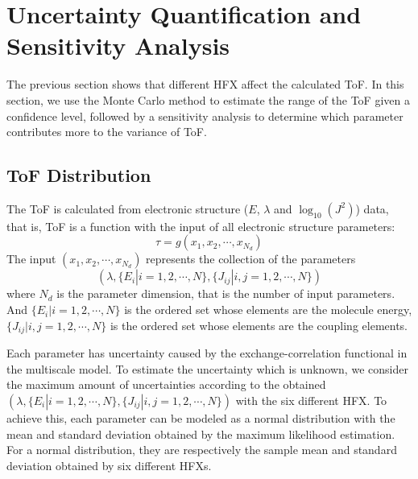 \documentclass[%
 reprint,
superscriptaddress,
 amsmath,amssymb,
 aps,
prb,
floatfix
]{revtex4-2}
\begin{document}
\section{Uncertainty Quantification and Sensitivity Analysis}
\label{sec:UQ}
The previous section shows that different HFX affect the calculated ToF. In this section, we use the Monte Carlo method to estimate the range of the ToF given a confidence level, followed by a sensitivity analysis to determine which parameter contributes more to the variance of ToF. 

\subsection{ToF Distribution}
The ToF is calculated from electronic structure ($E$, $\lambda$ and $\log_{10}(J^2)$) data, that is, ToF is a function with the input of all electronic structure parameters:
\begin{equation}
    \tau = g(x_1, x_2, \cdots, x_{N_d})
    \label{eq:tau1}
\end{equation}
The input $(x_1, x_2, \cdots, x_{N_d})$ represents the collection of the parameters $$(\lambda, \{E_i|i=1,2,\cdots,N \}, \{J_{ij}|i,j=1,2,\cdots,N \})$$  where $N_d$ is the parameter dimension, that is the number of input parameters. 
And $\{E_i|i=1,2,\cdots,N \}$ is the ordered set whose elements are the molecule energy,
$\{J_{ij}|i,j=1,2,\cdots,N \}$ is the ordered set whose elements are the coupling elements. 

Each parameter has uncertainty caused by the exchange-correlation functional in the multiscale model.
To estimate the uncertainty which is unknown, we consider the maximum amount of uncertainties according to the obtained $(\lambda, \{E_i|i=1,2,\cdots,N \}, \{J_{ij}|i,j=1,2,\cdots,N \})$ with the six different HFX.
To achieve this, each parameter can be modeled as a normal distribution with the mean and standard deviation obtained by the maximum likelihood estimation. For a normal distribution, they are respectively the sample mean and standard deviation obtained by six different HFXs.
\end{document}

